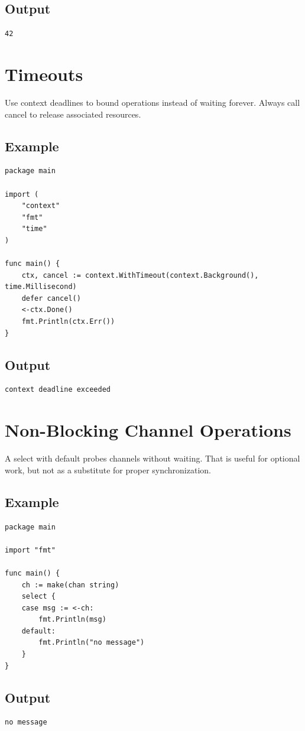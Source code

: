 \documentclass[10pt,oneside]{article}
\newcommand{\sectionline}{\par\vspace{4pt}{\color{rule}\hrule height .5pt}\vspace{7pt}\color{ink}\noindent}
\begin{document}
\subsection*{Output}
\begin{lstlisting}[style=terminal]
42
\end{lstlisting}
\clearpage
\section{Timeouts}
\sectionline
Use context deadlines to bound operations instead of waiting forever. Always call cancel to release associated resources.\par
\subsection*{Example}
\begin{lstlisting}[style=gocode]
package main

import (
	"context"
	"fmt"
	"time"
)

func main() {
	ctx, cancel := context.WithTimeout(context.Background(), time.Millisecond)
	defer cancel()
	<-ctx.Done()
	fmt.Println(ctx.Err())
}
\end{lstlisting}
\subsection*{Output}
\begin{lstlisting}[style=terminal]
context deadline exceeded
\end{lstlisting}
\clearpage
\section{Non-Blocking Channel Operations}
\sectionline
A select with default probes channels without waiting. That is useful for optional work, but not as a substitute for proper synchronization.\par
\subsection*{Example}
\begin{lstlisting}[style=gocode]
package main

import "fmt"

func main() {
	ch := make(chan string)
	select {
	case msg := <-ch:
		fmt.Println(msg)
	default:
		fmt.Println("no message")
	}
}
\end{lstlisting}
\subsection*{Output}
\begin{lstlisting}[style=terminal]
no message
\end{lstlisting}
\clearpage
\end{document}
